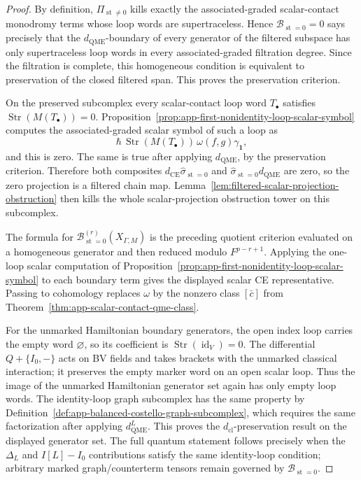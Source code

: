 \begin{proof}
  By definition,
  \(\Pi_{\operatorname{st}\neq0}\) kills exactly the associated-graded
  scalar-contact monodromy terms whose loop words are supertraceless.
  Hence
  \(\mathcal B_{\operatorname{st}=0}=0\) says precisely that the
  \(d_{\mathrm{QME}}\)-boundary of every generator of the filtered subspace has
  only supertraceless loop words in every associated-graded filtration
  degree.  Since the filtration is complete, this homogeneous condition
  is equivalent to preservation of the closed filtered span.  This proves
  the preservation criterion.

  On the preserved subcomplex every scalar-contact loop word
  \(T_\bullet\) satisfies
  \(\operatorname{Str}(M(T_\bullet))=0\).  Proposition~\ref{prop:app-first-nonidentity-loop-scalar-symbol}
  computes the associated-graded scalar symbol of such a loop as
  \[
    \hbar\,\operatorname{Str}(M(T_\bullet))\,
    \omega(f,g)\gamma_{\mathbf 1},
  \]
  and this is zero.  The same is true after applying
  \(d_{\mathrm{QME}}\), by the preservation criterion.  Therefore both
  composites
  \(d_{\mathrm{CE}}\widehat\sigma_{\operatorname{st}=0}\) and
  \(\widehat\sigma_{\operatorname{st}=0}d_{\mathrm{QME}}\) are zero, so
  the zero projection is a filtered chain map.  Lemma~\ref{lem:filtered-scalar-projection-obstruction}
  then kills the whole scalar-projection obstruction tower on this
  subcomplex.

  The formula for
  \(\mathcal B^{(r)}_{\operatorname{st}=0}(X_{\Gamma,M})\) is the
  preceding quotient criterion evaluated on a homogeneous generator and
  then reduced modulo \(F^{p-r+1}\).  Applying the one-loop scalar
  computation of
  Proposition~\ref{prop:app-first-nonidentity-loop-scalar-symbol} to each
  boundary term gives the displayed scalar CE representative.  Passing to
  cohomology replaces \(\omega\) by the nonzero class
  \([\bar c]\) from
  Theorem~\ref{thm:app-scalar-contact-qme-class}.

  For the unmarked Hamiltonian boundary generators, the open index loop
  carries the empty word \(\varnothing\), so its
  coefficient is
  \(\operatorname{Str}(\operatorname{id}_V)=0\).  The differential
  \(Q+\{I_0,-\}\) acts on BV fields and takes brackets with the
  unmarked classical interaction; it preserves the empty marker word on an
  open scalar loop.
  Thus the image of the unmarked Hamiltonian generator set again has only
  empty loop words.  The identity-loop graph subcomplex has the same
  property by
  Definition~\ref{def:app-balanced-costello-graph-subcomplex}, which
  requires the same factorization after applying \(d_{\mathrm{QME}}^L\).
  This proves the \(d_{\mathrm{cl}}\)-preservation result on the
  displayed generator set.  The full quantum statement follows precisely
  when the \(\Delta_L\) and \(I[L]-I_0\) contributions satisfy the same
  identity-loop condition; arbitrary marked graph/counterterm tensors
  remain governed by \(\mathcal B_{\operatorname{st}=0}\).
\end{proof}


